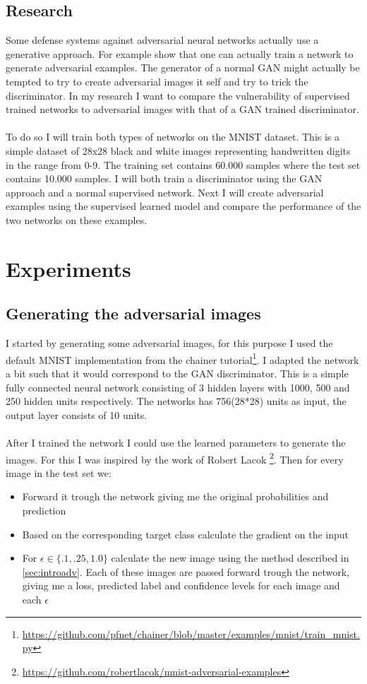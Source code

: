 \documentclass[a4paper]{article}
\begin{document}
\subsection{Research}
Some defense systems against adversarial neural networks actually use a generative approach. For example \cite{advexmlgan} show that one can actually train a network to generate adversarial examples. The generator of a normal GAN might actually be tempted to try to create adversarial images it self and try to trick the discriminator. In my research I want to compare the vulnerability of supervised trained networks to adversarial images with that of a GAN trained discriminator.   \\ \\
To do so I will train both types of networks on the MNIST dataset. This is a simple dataset of 28x28 black and white images representing handwritten digits in the range from 0-9. The training set contains 60.000 samples where the test set contains 10.000 samples.  I will both train a discriminator using the GAN approach and a normal supervised network. Next I will 
create adversarial examples using  the supervised learned model and compare the performance of the two networks on these examples. 
\section{Experiments}

\subsection{Generating the adversarial images}\label{sec:exsup}
I started by generating some adversarial images, for this purpose I used the default MNIST implementation from the chainer tutorial\footnote{\url{https://github.com/pfnet/chainer/blob/master/examples/mnist/train_mnist.py}}. I adapted the network a bit such that it would correspond to the GAN discriminator. This is a simple fully connected neural network consisting of 3 hidden layers with 1000, 500 and 250 hidden units respectively. The networks has 756(28*28) units as input, the output layer consists of 10 units. \\ \\
After I trained the network I could use the learned parameters to generate the images. For this I was inspired by the work of Robert Lacok \footnote{\url{https://github.com/robertlacok/mnist-adversarial-examples}}. Then for every image in the test set we:\\
\begin{itemize}
\item Forward it trough the network giving me the original probabilities and prediction
\item Based on the corresponding target class calculate the gradient on the input
\item For $\epsilon \in \{.1,.25,1.0\}$ calculate the new image using the method described in \ref{sec:introadv}. Each of these images are passed forward trough the network, giving me a loss, predicted label and confidence levels for each image and each $\epsilon$
\end{itemize} 
\end{document}
